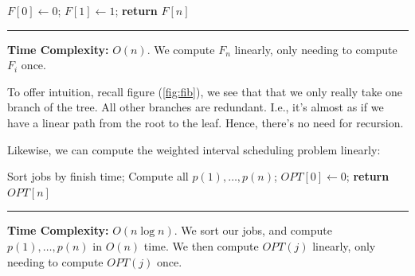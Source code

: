     \begin{Func}

        \vspace{-.5em}
        \begin{algorithm}[H]
            \SetAlgoLined
            $F[0] \gets 0$; $F[1] \gets 1$; 
            \textbf{return} $F[n]$\;
        \end{algorithm}
        \noindent
        \rule{\textwidth}{0.4pt}
        \textbf{Time Complexity:} $O(n)$. We compute $F_n$ linearly, only needing to compute $F_i$ once.
    \end{Func}
    \noindent
    To offer intuition, recall figure (\ref{fig:fib}), we see that that we only really take one branch of the tree. All other branches are
    redundant. I.e., it's almost as if we have a linear path from the root to the leaf. Hence, there's no need for recursion.

    \newpage
    \noindent
    Likewise, we can compute the weighted interval scheduling problem linearly:
    \begin{Func}

        \vspace{-.5em}
        \begin{algorithm}[H]
            \SetAlgoLined
            Sort jobs by finish time; 
            Compute all $p(1),\dots,p(n)$; 
            $OPT[0] \gets 0$; 
            \textbf{return} $OPT[n]$\;
        \end{algorithm}
        \noindent
        \rule{\textwidth}{0.4pt}
        \textbf{Time Complexity:} $O(n\log n)$. We sort our jobs, and compute $p(1),\dots,p(n)$ in $O(n)$ time. We then compute $OPT(j)$ linearly, only needing to compute $OPT(j)$ once.
    \end{Func}


\begin{table}[h!]
    \centering

\end{table}

